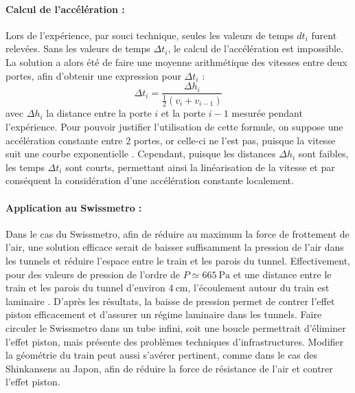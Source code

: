 \documentclass[a4paper, 12pt,oneside]{article}
\begin{document}
 \paragraph{Calcul de l'accélération : } Lors de l'expérience, par souci technique, seules les valeurs de temps $dt_i$ furent relevées. Sans les valeurs de temps $\Delta t_i$, le calcul de l'accélération est impossible. La solution a alors été de faire une moyenne arithmétique des vitesses entre deux portes, afin d'obtenir une expression pour $\Delta t_i$ :
\begin{equation}
    \Delta t_i = \frac{\Delta h_i }{\frac{1}{2}(v_i + v_{i-1})}
    \label{eq:Deltat}
\end{equation}
avec $\Delta h_i$ la distance entre la porte $i$ et la porte $i-1$ mesurée pendant l'expérience. Pour pouvoir justifier l'utilisation de cette formule, on suppose une accélération constante entre 2 portes, or celle-ci ne l'est pas, puisque la vitesse suit une courbe exponentielle \cite{notice}. Cependant, puisque les distances $\Delta h_i $ sont faibles, les temps $\Delta t_i$ sont courts, permettant ainsi la linéarisation de la vitesse et par conséquent la considération d'une accélération constante localement.

\paragraph{Application au Swissmetro : }
Dans le cas du Swissmetro, afin de réduire au maximum la force de frottement de l'air, une solution efficace serait de baisser suffisamment la pression de l'air dans les tunnels et réduire l'espace entre le train et les parois du tunnel. Effectivement, pour des valeurs de pression de l'ordre de $P \simeq 665~ \mathrm{Pa}$ et une distance entre le train et les parois du tunnel d'environ $4~\mathrm{cm}$, l'écoulement autour du train est laminaire \cite{notice}. D'après les résultats, la baisse de pression permet de contrer l'effet piston efficacement et d'assurer un régime laminaire dans les tunnels. Faire circuler le Swissmetro dans un tube infini, soit une boucle permettrait d'éliminer l'effet piston, mais présente des problèmes techniques d'infrastructures. Modifier la géométrie du train peut aussi s'avérer pertinent, comme dans le cas des Shinkansens \cite{ref2} au Japon, afin de réduire la force de résistance de l'air et contrer l'effet piston. 

%
\end{document}
